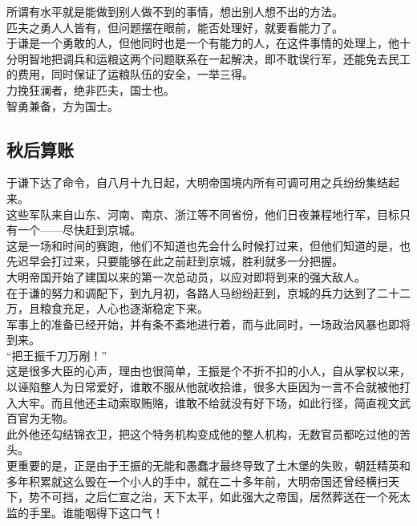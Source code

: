 \begin{multicols}{\theparacolNo}
所谓有水平就是能做到别人做不到的事情，想出别人想不出的方法。\\

匹夫之勇人人皆有，但问题摆在眼前，能否处理好，就要看能力了。\\

于谦是一个勇敢的人，但他同时也是一个有能力的人，在这件事情的处理上，他十分明智地把调兵和运粮这两个问题联系在一起解决，即不耽误行军，还能免去民工的费用，同时保证了运粮队伍的安全，一举三得。\\

力挽狂澜者，绝非匹夫，国士也。\\

智勇兼备，方为国士。\\

\subsection{秋后算账}
于谦下达了命令，自八月十九日起，大明帝国境内所有可调可用之兵纷纷集结起来。\\

这些军队来自山东、河南、南京、浙江等不同省份，他们日夜兼程地行军，目标只有一个——尽快赶到京城。\\

这是一场和时间的赛跑，他们不知道也先会什么时候打过来，但他们知道的是，也先迟早会打过来，只要能够在此之前赶到京城，胜利就多一分把握。\\

大明帝国开始了建国以来的第一次总动员，以应对即将到来的强大敌人。\\

在于谦的努力和调配下，到九月初，各路人马纷纷赶到，京城的兵力达到了二十二万，且粮食充足，人心也逐渐稳定下来。\\

军事上的准备已经开始，并有条不紊地进行着，而与此同时，一场政治风暴也即将到来。\\

“把王振千刀万剐！”\\

这是很多大臣的心声，理由也很简单，王振是个不折不扣的小人，自从掌权以来，以诬陷整人为日常爱好，谁敢不服从他就收拾谁，很多大臣因为一言不合就被他打入大牢。而且他还主动索取贿赂，谁敢不给就没有好下场，如此行径，简直视文武百官为无物。\\

此外他还勾结锦衣卫，把这个特务机构变成他的整人机构，无数官员都吃过他的苦头。\\

更重要的是，正是由于王振的无能和愚蠢才最终导致了土木堡的失败，朝廷精英和多年积累就这么毁在一个小人的手中，就在二十多年前，大明帝国还曾经横扫天下，势不可挡，之后仁宣之治，天下太平，如此强大之帝国，居然葬送在一个死太监的手里。谁能咽得下这口气！\\


\end{multicols}
